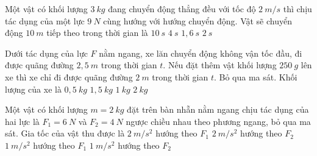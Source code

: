 \begin{ex}%
Một vật có khối lượng $3\ kg$ đang chuyển động thẳng đều với tốc độ $2\ m/s$ thì chịu tác dụng của một lực $9\ N$ cùng hướng với hướng chuyển động. Vật sẽ chuyển động $10\ m$ tiếp theo trong thời gian là
\choice
{$10\ s$}
{$4\ s$}
{$1,6\ s$}
{\True $2\ s$}
  \end{ex}
\begin{ex}%
Dưới tác dụng của lực $F$ nằm ngang, xe lăn chuyển động không vận tốc đầu, đi được quãng đường $2,5\ m$ trong thời gian $t$. Nếu đặt thêm vật khối lượng $250\ g$ lên xe thì xe chỉ đi được quãng đường $2\ m$ trong thời gian $t$. Bỏ qua ma sát. Khối lượng của xe là
\choice
{$0,5\ kg$}
{$1,5\ kg$}
{\True $1\ kg$}
{$2\ kg$}

 \end{ex}
\begin{ex}%
Một vật có khối lượng $m=2\ kg$ đặt trên bàn nhẵn nằm ngang chịu tác dụng của hai lực là $F_1=6\ N$ và $F_2=4\ N$ ngược chiều nhau theo phương ngang, bỏ qua ma sát. Gia tốc của vật thu được là
\choice
{$2\ m/s^2$ hướng theo $F_1$}
{$2\ m/s^2$ hướng theo $F_2$}
{\True $1\ m/s^2$ hướng theo $F_1$}
{$1\ m/s^2$ hướng theo $F_2$}
  \end{ex}






